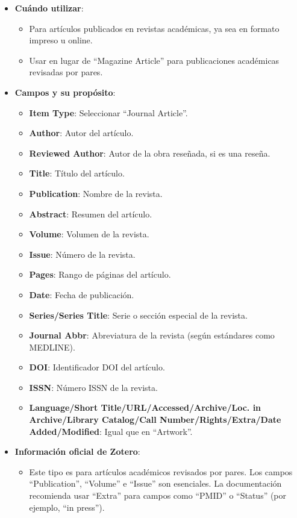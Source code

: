 \documentclass[
  jou,
  floatsintext,
  longtable,
  a4paper,
  nolmodern,
  notxfonts,
  notimes,
  colorlinks=true,linkcolor=blue,citecolor=blue,urlcolor=blue]{apa7}
\providecommand{\tightlist}{%
  \setlength{\itemsep}{0pt}\setlength{\parskip}{0pt}}
\begin{document}
\begin{itemize}
\tightlist
\item
  \textbf{Cuándo utilizar}:

  \begin{itemize}
  \tightlist
  \item
    Para artículos publicados en revistas académicas, ya sea en formato
    impreso u online.
  \item
    Usar en lugar de ``Magazine Article'' para publicaciones académicas
    revisadas por pares.
  \end{itemize}
\item
  \textbf{Campos y su propósito}:

  \begin{itemize}
  \tightlist
  \item
    \textbf{Item Type}: Seleccionar ``Journal Article''.
  \item
    \textbf{Author}: Autor del artículo.
  \item
    \textbf{Reviewed Author}: Autor de la obra reseñada, si es una
    reseña.
  \item
    \textbf{Title}: Título del artículo.
  \item
    \textbf{Publication}: Nombre de la revista.
  \item
    \textbf{Abstract}: Resumen del artículo.
  \item
    \textbf{Volume}: Volumen de la revista.
  \item
    \textbf{Issue}: Número de la revista.
  \item
    \textbf{Pages}: Rango de páginas del artículo.
  \item
    \textbf{Date}: Fecha de publicación.
  \item
    \textbf{Series/Series Title}: Serie o sección especial de la
    revista.
  \item
    \textbf{Journal Abbr}: Abreviatura de la revista (según estándares
    como MEDLINE).
  \item
    \textbf{DOI}: Identificador DOI del artículo.
  \item
    \textbf{ISSN}: Número ISSN de la revista.
  \item
    \textbf{Language/Short Title/URL/Accessed/Archive/Loc. in
    Archive/Library Catalog/Call Number/Rights/Extra/Date
    Added/Modified}: Igual que en ``Artwork''.
  \end{itemize}
\item
  \textbf{Información oficial de Zotero}:

  \begin{itemize}
  \tightlist
  \item
    Este tipo es para artículos académicos revisados por pares. Los
    campos ``Publication'', ``Volume'' e ``Issue'' son esenciales. La
    documentación recomienda usar ``Extra'' para campos como ``PMID'' o
    ``Status'' (por ejemplo, ``in press'').
  \end{itemize}
\end{itemize}
\end{document}
